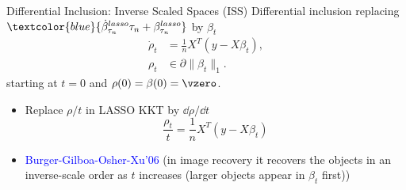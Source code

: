 \documentclass[slidestop,compress,9pt,epsfig,color]{beamer}
\theoremstyle{example}
\begin{document}
\begin{frame}{Differential Inclusion: Inverse Scaled Spaces (ISS)}
Differential inclusion replacing $\textcolor{blue}{\dot \beta^{lasso}_{\tau_n} \tau_n + \beta^{lasso}_{\tau_n}}$ by $\beta_t$ 
\begin{subequations}\label{eq:bregman-iss}
\begin{align}
 \dot\rho_t&=\frac{1}{n} X^T(y-X\beta_t),\label{eq:bregman-issa}\\
 \rho_t &\in \partial\|\beta_t\|_1. \label{eq:bregman-issb}
\end{align}
\end{subequations}
starting at $t=0$ and $\rho(0)=\beta(0)=\vzero$.
\begin{itemize}
\item Replace $\rho/t$ in LASSO KKT by $\dd \rho/\dd t$
\[ \frac{\rho_t}{t}=\frac{1}{n} X^T(y-X{\beta}_t) \]
\item \textcolor{blue}{Burger-Gilboa-Osher-Xu'06} (in image recovery it recovers the objects in an inverse-scale order as $t$ increases (larger objects appear in $\beta_t$ first))
\end{itemize}
\end{frame}
\end{document}
